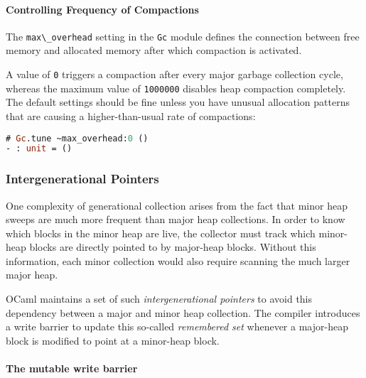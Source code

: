 \hypertarget{controlling-frequency-of-compactions}{%
\paragraph{Controlling Frequency of
Compactions}\label{controlling-frequency-of-compactions}}

The \passthrough{\lstinline!max\_overhead!} setting in the
\passthrough{\lstinline!Gc!} module defines the connection between free
memory and allocated memory after which compaction is activated.

A value of \passthrough{\lstinline!0!} triggers a compaction after every
major garbage collection cycle, whereas the maximum value of
\passthrough{\lstinline!1000000!} disables heap compaction completely.
The default settings should be fine unless you have unusual allocation
patterns that are causing a higher-than-usual rate of compactions:

\begin{lstlisting}[language=Caml]
# Gc.tune ~max_overhead:0 ()
- : unit = ()
\end{lstlisting}

\hypertarget{inter-generational-pointers}{%
\subsubsection{Intergenerational
Pointers}\label{inter-generational-pointers}}

One complexity of generational collection arises from the fact that
minor heap sweeps are much more frequent than major heap collections. In
order to know which blocks in the minor heap are live, the collector
must track which minor-heap blocks are directly pointed to by major-heap
blocks. Without this information, each minor collection would also
require scanning the much larger major heap.

OCaml maintains a set of such \emph{intergenerational pointers} to avoid
this dependency between a major and minor heap collection. The compiler
introduces a write barrier to update this so-called \emph{remembered
set} whenever a major-heap block is modified to point at a minor-heap
block. 

\hypertarget{the-mutable-write-barrier}{%
\paragraph{The mutable write barrier}\label{the-mutable-write-barrier}}

